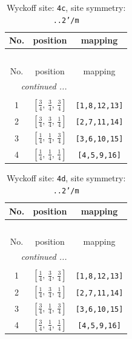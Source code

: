 \documentclass[fleqn,8pt]{jsarticle}
\begin{document}
\renewcommand{\arraystretch}{1.2}
\begin{longtable}{ccc}
\caption{Wyckoff site: {\tt 4c}, site symmetry: {\tt ..2'/m}}
 \\
 \hline \hline
No. & position & mapping \\ \hline \endfirsthead

\multicolumn{2}{l}{\tablename\ \thetable{}} \\
 \hline \hline
No. & position & mapping \\ \hline \endhead

 \hline \hline
\multicolumn{2}{r}{\footnotesize\it continued ...} \\ \endfoot

 \hline \hline
\multicolumn{2}{r}{} \\ \endlastfoot

1 & $\left[ \frac{3}{4},\, \frac{3}{4},\, \frac{3}{4} \right]$ & {\tt [1,8,12,13]} \\ \hline
2 & $\left[ \frac{3}{4},\, \frac{3}{4},\, \frac{1}{4} \right]$ & {\tt [2,7,11,14]} \\ \hline
3 & $\left[ \frac{1}{4},\, \frac{1}{4},\, \frac{3}{4} \right]$ & {\tt [3,6,10,15]} \\ \hline
4 & $\left[ \frac{1}{4},\, \frac{1}{4},\, \frac{1}{4} \right]$ & {\tt [4,5,9,16]} \\
\end{longtable}
\renewcommand{\arraystretch}{1.2}
\begin{longtable}{ccc}
\caption{Wyckoff site: {\tt 4d}, site symmetry: {\tt ..2'/m}}
 \\
 \hline \hline
No. & position & mapping \\ \hline \endfirsthead

\multicolumn{2}{l}{\tablename\ \thetable{}} \\
 \hline \hline
No. & position & mapping \\ \hline \endhead

 \hline \hline
\multicolumn{2}{r}{\footnotesize\it continued ...} \\ \endfoot

 \hline \hline
\multicolumn{2}{r}{} \\ \endlastfoot

1 & $\left[ \frac{1}{4},\, \frac{3}{4},\, \frac{3}{4} \right]$ & {\tt [1,8,12,13]} \\ \hline
2 & $\left[ \frac{1}{4},\, \frac{3}{4},\, \frac{1}{4} \right]$ & {\tt [2,7,11,14]} \\ \hline
3 & $\left[ \frac{3}{4},\, \frac{1}{4},\, \frac{3}{4} \right]$ & {\tt [3,6,10,15]} \\ \hline
4 & $\left[ \frac{3}{4},\, \frac{1}{4},\, \frac{1}{4} \right]$ & {\tt [4,5,9,16]} \\
\end{longtable}
\end{document}
